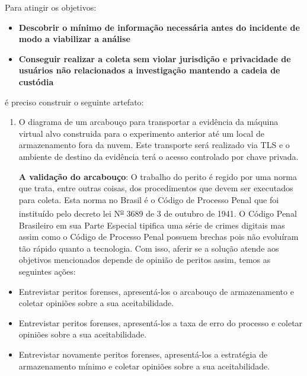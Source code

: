 \documentclass[12pt,				%
	openright,			%
	oneside,			%
	a4paper,			%
	english,			%
	brazil				%
	]{abntex2}
\begin{document}
\begin{flushleft}Para atingir os objetivos: \end{flushleft} 

\begin{itemize}
 \item \textbf{Descobrir o mínimo de informação necessária antes do incidente de modo a viabilizar a análise}
 \item \textbf{Conseguir realizar a coleta sem violar jurisdição e privacidade de usuários não relacionados a investigação mantendo a cadeia de custódia} 
\end{itemize}

\begin{flushleft}é preciso construir o seguinte artefato:\end{flushleft}

\begin{enumerate}

\item O diagrama de um arcabouço para transportar a evidência da máquina virtual alvo construida para o experimento anterior até um local de armazenamento fora da nuvem. Este 
transporte será realizado via TLS e o ambiente de destino da evidência terá o acesso controlado por chave privada.

\textbf{A validação do arcabouço}: O trabalho do perito é regido por uma norma que trata, entre outras coisas, dos procedimentos que devem ser executados para coleta. Esta norma no Brasil é o 
Código de Processo Penal que foi instituído pelo decreto lei N\textsuperscript{\underline{o}} 3689 de 3 de outubro de 1941. O Código Penal Brasileiro em sua Parte Especial 
tipifica uma série de crimes digitais mas assim como o Código de Processo Penal possuem brechas \cite{Do2014} pois não evoluíram tão rápido quanto a tecnologia. Com isso, 
aferir se a solução atende aos objetivos mencionados depende de opinião de peritos assim, temos as seguintes ações:

\end{enumerate}

\begin{itemize}

\item Entrevistar peritos forenses, apresentá-los o arcabouço de armazenamento e coletar opiniões sobre a sua aceitabilidade.

\item Entrevistar peritos forenses, apresentá-los a taxa de erro do processo e coletar opiniões sobre a sua aceitabilidade.

\item Entrevistar novamente peritos forenses, apresentá-los a estratégia de armazenamento mínimo e coletar opiniões sobre a sua aceitabilidade. 

\end{itemize}
\end{document}
